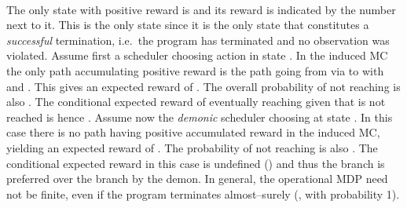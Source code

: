 \begin{example}
\begin{center}
{
 }\\
\end{center}
The only state with positive reward is  and its reward is indicated by the number  next to it.
This is the only state since it is the only state that constitutes a \emph{successful} termination, i.e.\ the program has terminated and no observation was violated.
Assume first a scheduler choosing action  in state .
In the induced MC the only path accumulating positive reward is the path  going from  via
 to  with  and . 
This gives an expected reward of .
The overall probability of not reaching  is also . 
The conditional expected reward of eventually reaching  given that  is not reached is hence . 
Assume now the \emph{demonic} scheduler choosing  at state . 
In this case there is no path having positive accumulated reward in the induced MC, yielding an expected reward of . 
The probability of not reaching  is also . 
The conditional expected reward in this case is undefined () and thus the  branch is preferred over the  branch by the demon. 
In general, the operational MDP need not be finite, even if the program terminates almost--surely (\ie, with probability 1).
\hfill
\end{example}
\fi

